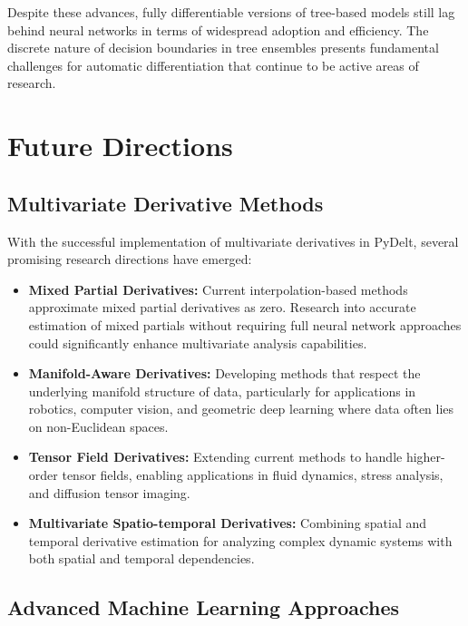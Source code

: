 \documentclass{article}
\begin{document}
Despite these advances, fully differentiable versions of tree-based models still lag behind neural networks in terms of widespread adoption and efficiency. The discrete nature of decision boundaries in tree ensembles presents fundamental challenges for automatic differentiation that continue to be active areas of research.

\section{Future Directions}

\subsection{Multivariate Derivative Methods}

With the successful implementation of multivariate derivatives in PyDelt, several promising research directions have emerged:

\begin{itemize}
    \item \textbf{Mixed Partial Derivatives:} Current interpolation-based methods approximate mixed partial derivatives as zero. Research into accurate estimation of mixed partials without requiring full neural network approaches could significantly enhance multivariate analysis capabilities.
    
    \item \textbf{Manifold-Aware Derivatives:} Developing methods that respect the underlying manifold structure of data, particularly for applications in robotics, computer vision, and geometric deep learning where data often lies on non-Euclidean spaces.
    
    \item \textbf{Tensor Field Derivatives:} Extending current methods to handle higher-order tensor fields, enabling applications in fluid dynamics, stress analysis, and diffusion tensor imaging.
    
    \item \textbf{Multivariate Spatio-temporal Derivatives:} Combining spatial and temporal derivative estimation for analyzing complex dynamic systems with both spatial and temporal dependencies.
\end{itemize}

\subsection{Advanced Machine Learning Approaches}
\end{document}
